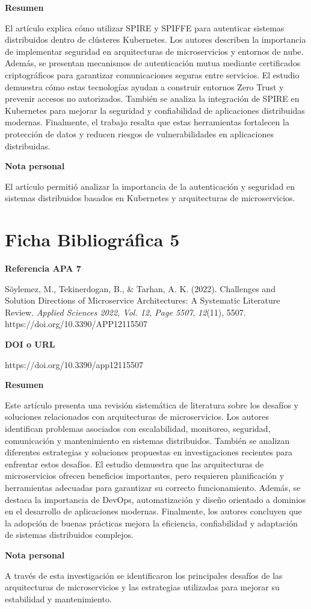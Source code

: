 \documentclass[12pt]{article}
\begin{document}
\textbf{Resumen}

El artículo explica cómo utilizar SPIRE y SPIFFE para autenticar sistemas distribuidos dentro de clústeres Kubernetes. Los autores describen la importancia de implementar seguridad en arquitecturas de microservicios y entornos de nube. Además, se presentan mecanismos de autenticación mutua mediante certificados criptográficos para garantizar comunicaciones seguras entre servicios. El estudio demuestra cómo estas tecnologías ayudan a construir entornos Zero Trust y prevenir accesos no autorizados. También se analiza la integración de SPIRE en Kubernetes para mejorar la seguridad y confiabilidad de aplicaciones distribuidas modernas. Finalmente, el trabajo resalta que estas herramientas fortalecen la protección de datos y reducen riesgos de vulnerabilidades en aplicaciones distribuidas.

\vspace{0.3cm}

\textbf{Nota personal}

El artículo permitió analizar la importancia de la autenticación y seguridad en sistemas distribuidos basados en Kubernetes y arquitecturas de microservicios. 



\section*{Ficha Bibliográfica 5}

\textbf{Referencia APA 7}

Söylemez, M., Tekinerdogan, B., \& Tarhan, A. K. (2022). Challenges and Solution Directions of Microservice Architectures: A Systematic Literature Review. \textit{Applied Sciences 2022, Vol. 12, Page 5507}, \textit{12}(11), 5507. https://doi.org/10.3390/APP12115507

\vspace{0.3cm}

\textbf{DOI o URL}

https://doi.org/10.3390/app12115507

\vspace{0.3cm}

\textbf{Resumen}

Este artículo presenta una revisión sistemática de literatura sobre los desafíos y soluciones relacionados con arquitecturas de microservicios. Los autores identifican problemas asociados con escalabilidad, monitoreo, seguridad, comunicación y mantenimiento en sistemas distribuidos. También se analizan diferentes estrategias y soluciones propuestas en investigaciones recientes para enfrentar estos desafíos. El estudio demuestra que las arquitecturas de microservicios ofrecen beneficios importantes, pero requieren planificación y herramientas adecuadas para garantizar su correcto funcionamiento. Además, se destaca la importancia de DevOps, automatización y diseño orientado a dominios en el desarrollo de aplicaciones modernas. Finalmente, los autores concluyen que la adopción de buenas prácticas mejora la eficiencia, confiabilidad y adaptación de sistemas distribuidos complejos.

\vspace{0.3cm}

\textbf{Nota personal}

A través de esta investigación se identificaron los principales desafíos de las arquitecturas de microservicios y las estrategias utilizadas para mejorar su estabilidad y mantenimiento. 
\end{document}
